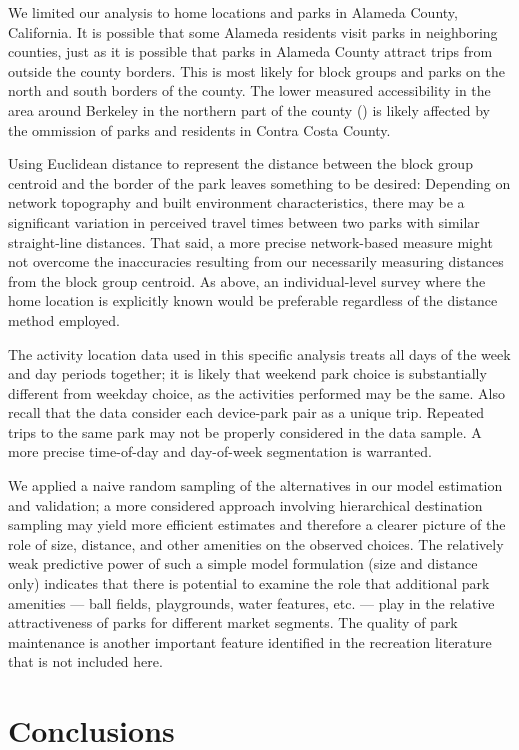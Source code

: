 \documentclass[]{elsarticle} %
\begin{document}
We limited our analysis to home locations and parks in Alameda County,
California. It is possible that some Alameda residents visit parks in
neighboring counties, just as it is possible that parks in Alameda County
attract trips from outside the county borders. This is most likely for block
groups and parks on the north and south borders of the county. The lower
measured accessibility in the area around Berkeley in the northern part of the
county () is likely affected by the ommission of parks and residents in Contra
Costa County.

Using Euclidean distance to represent the distance between the block group
centroid and the border of the park leaves something to be desired: Depending on
network topography and built environment characteristics, there may be a
significant variation in perceived travel times between two parks with similar
straight-line distances. That said, a more precise network-based measure might
not overcome the inaccuracies resulting from our necessarily measuring distances
from the block group centroid. As above, an individual-level survey where the
home location is explicitly known would be preferable regardless of the distance
method employed.

The activity location data used in this specific analysis treats all days of the
week and day periods together; it is likely that weekend park choice is
substantially different from weekday choice, as the activities performed may be
the same. Also recall that the data consider each device-park pair as a unique
trip. Repeated trips to the same park may not be properly considered in the data
sample. A more precise time-of-day and day-of-week segmentation is warranted.

We applied a naive random sampling of the alternatives in our model estimation
and validation; a more considered approach involving hierarchical destination
sampling may yield more efficient estimates and therefore a clearer picture of
the role of size, distance, and other amenities on the observed choices. The
relatively weak predictive power of such a simple model formulation (size and
distance only) indicates that there is potential to examine the role that
additional park amenities --- ball fields, playgrounds, water features, etc. ---
play in the relative attractiveness of parks for different market segments. The
quality of park maintenance is another important feature identified in the
recreation literature \citep{Fletcher2003} that is not included here.

\hypertarget{conclusions}{%
\section{Conclusions}\label{conclusions}}
\end{document}
